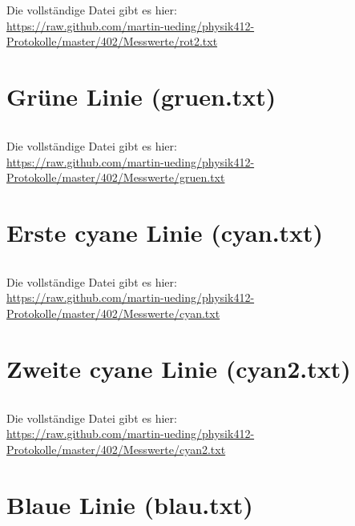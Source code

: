 \begin{appendix}
    Die vollständige Datei gibt es hier: \\
    \url{https://raw.github.com/martin-ueding/physik412-Protokolle/master/402/Messwerte/rot2.txt}

    \section{Grüne Linie (gruen.txt)}
    \begin{multicols}{5}
        \inputminted[tabsize=4, firstline=<< gruen_lower >>, lastline=<< gruen_upper >>, fontsize=\footnotesize]{text}{../Messwerte/gruen.txt}
    \end{multicols}

    Die vollständige Datei gibt es hier: \\
    \url{https://raw.github.com/martin-ueding/physik412-Protokolle/master/402/Messwerte/gruen.txt}

    \section{Erste cyane Linie (cyan.txt)}
    \begin{multicols}{5}
        \inputminted[tabsize=4, firstline=<< cyan_lower >>, lastline=<< cyan_upper >>, fontsize=\footnotesize]{text}{../Messwerte/cyan.txt}
    \end{multicols}

    Die vollständige Datei gibt es hier: \\
    \url{https://raw.github.com/martin-ueding/physik412-Protokolle/master/402/Messwerte/cyan.txt}

    \section{Zweite cyane Linie (cyan2.txt)}
    \begin{multicols}{5}
        \inputminted[tabsize=4, firstline=<< cyan2_lower >>, lastline=<< cyan2_upper >>, fontsize=\footnotesize]{text}{../Messwerte/cyan2.txt}
    \end{multicols}

    Die vollständige Datei gibt es hier: \\
    \url{https://raw.github.com/martin-ueding/physik412-Protokolle/master/402/Messwerte/cyan2.txt}

    \section{Blaue Linie (blau.txt)}
    \begin{multicols}{5}
        \inputminted[tabsize=4, firstline=<< blau_lower >>, lastline=<< blau_upper >>, fontsize=\footnotesize]{text}{../Messwerte/blau.txt}
    \end{multicols}


\end{appendix}

